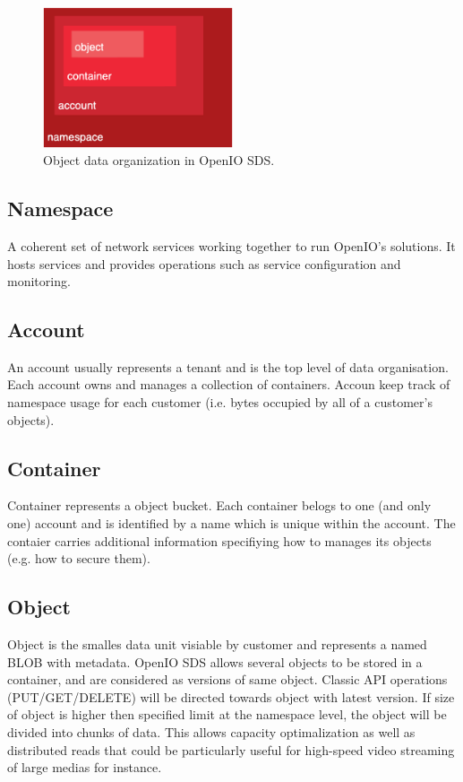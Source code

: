     \begin{figure}[hbt]
        \centering
        \includegraphics[width=0.5\textwidth]{obrazky-figures/openio-data-organization.eps}
        \caption{Object data organization in OpenIO SDS.\cite{oioCoreSolution}}
        \label{fig:oioDataOrganization}
    \end{figure}

    \subsection{Namespace}
    A coherent set of network services working together to run OpenIO’s solutions. It hosts services and provides operations such as service configuration and monitoring.

    \subsection{Account}
    An account usually represents a tenant and is the top level of data organisation. Each account owns and manages a collection of containers. Accoun keep track of namespace usage for each customer (i.e. bytes occupied by all of a customer's objects)\cite{oioCoreSolution}.

    \subsection{Container}
    Container represents a object bucket. Each container belogs to one (and only one) account and is identified by a name which is unique within the account. The contaier carries additional information specifiying how to manages its objects (e.g. how to secure them)\cite{oioCoreSolution}.

    \subsection{Object}
    Object is the smalles data unit visiable by customer and represents a named BLOB with metadata. OpenIO SDS allows several objects to be stored in a container, and are considered as versions of same object. Classic API operations (PUT/GET/DELETE) will be directed towards object with latest version. If size of object is higher then specified limit at the namespace level, the object will be divided into chunks of data. This allows capacity optimalization as well as distributed reads that could be particularly useful for high-speed video streaming of large medias for instance\cite{oioCoreSolution}.

